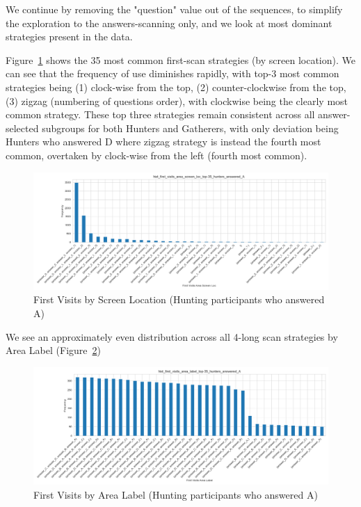 \documentclass{article}
\begin{document}
        We continue by removing the "question" value out of the sequences, to simplify the exploration to the answers-scanning only, and we look at most dominant strategies present in the data.

        Figure~\ref{fig:A_hunt_frst_loc} shows the 35 most common first-scan strategies (by screen location). We can see that the frequency of use diminishes rapidly, with top-3 most common strategies being (1) clock-wise from the top, (2) counter-clockwise from the top, (3) zigzag (numbering of questions order), with clockwise being the clearly most common strategy. These top three strategies remain consistent across all answer-selected subgroups for both Hunters and Gatherers, with only deviation being Hunters who answered D where zigzag strategy is instead the fourth most common, overtaken by clock-wise from the left (fourth most common). 

        \begin{figure}[H]
            \centering
            \includegraphics[width=1\linewidth]{plots/visits_hists/hist_first_visits_area_screen_loc_top-35_hunters_answered_A.png}
            \caption{First Visits by Screen Location (Hunting participants who answered A)}
            \label{fig:A_hunt_frst_loc}
        \end{figure}

        We see an approximately even distribution across all 4-long scan strategies by Area Label (Figure~\ref{fig:A_hunt_frst_lbl})

        \begin{figure}[H]
            \centering
            \includegraphics[width=1\linewidth]{plots/visits_hists/hist_first_visits_area_label_top-35_hunters_answered_A.png}
            \caption{First Visits by Area Label (Hunting participants who answered A)}
            \label{fig:A_hunt_frst_lbl}
        \end{figure}
        
\end{document}
